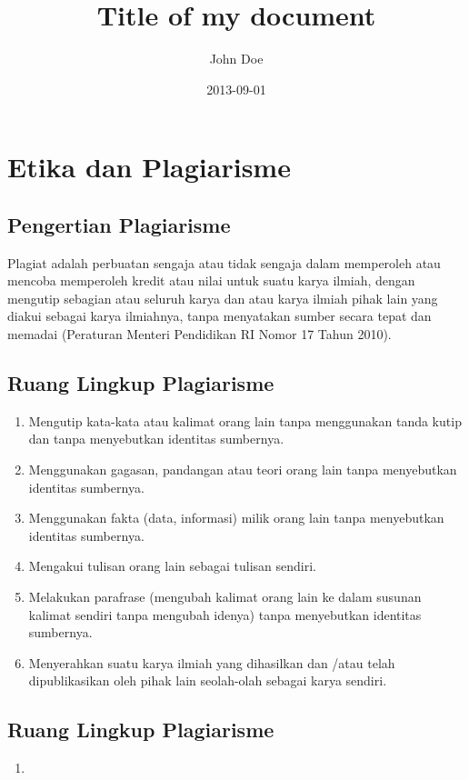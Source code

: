 \documentclass{article}
\title{Title of my document}
\date{2013-09-01}
\author{John Doe}
\begin{document}
\maketitle
{}
\newpage
{}

\section{Etika dan Plagiarisme}

\subsection{Pengertian Plagiarisme}

Plagiat adalah perbuatan sengaja atau tidak sengaja dalam memperoleh atau mencoba memperoleh kredit atau nilai untuk suatu karya ilmiah, dengan mengutip sebagian atau seluruh karya dan atau karya ilmiah pihak lain yang diakui sebagai karya ilmiahnya, tanpa menyatakan sumber secara tepat dan memadai (Peraturan Menteri Pendidikan RI Nomor 17 Tahun 2010).

\subsection{Ruang Lingkup Plagiarisme}
\begin{enumerate}
  \item Mengutip kata-kata atau kalimat orang lain tanpa menggunakan tanda kutip dan tanpa menyebutkan identitas sumbernya.
  \item Menggunakan gagasan, pandangan atau teori orang lain tanpa menyebutkan identitas sumbernya.
  \item Menggunakan fakta (data, informasi) milik orang lain tanpa menyebutkan identitas sumbernya.
  \item Mengakui tulisan orang lain sebagai tulisan sendiri.
  \item Melakukan parafrase (mengubah kalimat orang lain ke dalam susunan kalimat sendiri tanpa mengubah idenya) tanpa menyebutkan identitas sumbernya.
  \item Menyerahkan suatu karya ilmiah yang dihasilkan dan /atau telah dipublikasikan oleh pihak lain seolah-olah sebagai karya sendiri.
\end{enumerate}

\subsection{Ruang Lingkup Plagiarisme}
\begin{enumerate}
    \item 
\end{enumerate}
\end{document}

